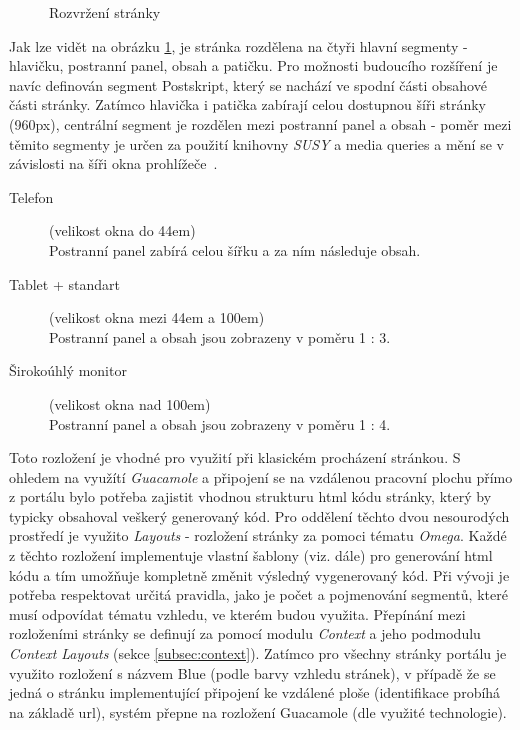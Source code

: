 \begin{figure}[htp] 
  \caption{Rozvržení stránky}
  \label{fig:rozvrzeni-stranky}
\end{figure}  

Jak lze vidět na obrázku \ref{fig:rozvrzeni-stranky}, je stránka rozdělena na čtyři hlavní segmenty - hlavičku, postranní panel, obsah a patičku. Pro možnosti budoucího rozšíření je navíc definován segment Postskript, který se nachází ve spodní části obsahové části stránky. Zatímco hlavička i patička zabírají celou dostupnou šíři stránky (960px), centrální segment je rozdělen mezi postranní panel a obsah - poměr mezi těmito segmenty je určen za použití knihovny \emph{SUSY} a media queries a mění se v závislosti na šíři okna prohlížeče~\cite{responsible-drupal}. 

\begin{description}
  \item[Telefon] (velikost okna do 44em) \hfill \\
  Postranní panel zabírá celou šířku a za ním následuje obsah.
  \item[Tablet + standart] (velikost okna mezi 44em a 100em) \hfill \\
  Postranní panel a obsah jsou zobrazeny v poměru 1 : 3.
  \item[Širokoúhlý monitor] (velikost okna nad 100em) \hfill \\
  Postranní panel a obsah jsou zobrazeny v poměru 1 : 4.  
\end{description}

Toto rozložení je vhodné pro využití při klasickém procházení stránkou. S ohledem na využítí \emph{Guacamole} a připojení se na vzdálenou pracovní plochu přímo z portálu bylo potřeba zajistit vhodnou strukturu html kódu stránky, který by typicky obsahoval veškerý generovaný kód. Pro oddělení těchto dvou nesourodých prostředí je využito \emph{Layouts} - rozložení stránky za pomoci tématu \emph{Omega}. Každé z těchto rozložení implementuje vlastní šablony (viz. dále) pro generování html kódu a tím umožňuje kompletně změnit výsledný vygenerovaný kód. Při vývoji je potřeba respektovat určitá pravidla, jako je počet a pojmenování segmentů, které musí odpovídat tématu vzhledu, ve kterém budou využita. Přepínání mezi rozloženími stránky se definují za pomocí modulu \emph{Context} a jeho podmodulu \emph{Context Layouts} (sekce \ref{subsec:context}). Zatímco pro všechny stránky portálu je využito rozložení s názvem Blue (podle barvy vzhledu stránek), v případě že se jedná o stránku implementující připojení ke vzdálené ploše (identifikace probíhá na základě \gls{url}), systém přepne na rozložení Guacamole (dle využité technologie).

